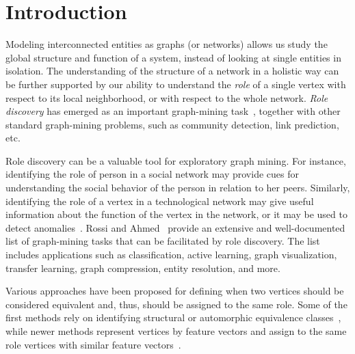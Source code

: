\section{Introduction}


Modeling interconnected entities as graphs (or networks)
allows us study the global structure and function of a system,
instead of looking at single entities in isolation.
The understanding of the structure of a network in a holistic way
can be further supported by our ability to 
understand the \emph{role} of a single vertex 
with respect to its local neighborhood, 
or with respect to the whole network.
\emph{Role discovery} 
has emerged as an important
graph-mining task~\cite{gilpin2013guided,danilevsky2013entity,henderson2012rolx,rossi2015role,ruan2014simultaneous,yang2015network,zhao2013inferring}, 
together with other standard graph-mining problems, 
such as community detection, link prediction,  etc.

Role discovery can be a valuable tool for exploratory graph mining. 
For instance, identifying the role of person in a social network 
may provide cues for understanding the social behavior of the person
in relation to her peers. 
Similarly, identifying the role of a vertex in a technological network 
may give useful information about the function of the vertex in the network, 
or it may be used to detect anomalies~\cite{rossi2013multi}.
Rossi and Ahmed~\cite{rossi2015role}
provide an extensive and well-documented list of graph-mining tasks
that can be facilitated by role discovery. 
The list includes applications such as 
classification, active learning, graph visualization, 
transfer learning, graph compression, entity resolution, and more.


Various approaches have been proposed
for defining when two vertices should be considered equivalent and, thus,  
should be assigned to the same role. 
Some of the first methods %
rely on identifying structural or automorphic equivalence 
classes~\cite{everett1994regular,lorrain1971structural}, 
while newer methods 
represent vertices by feature vectors 
and assign to the same role vertices with similar 
feature vectors~\cite{henderson2012rolx,rossi2015role,rossi2013modeling,zhao2013inferring}.


